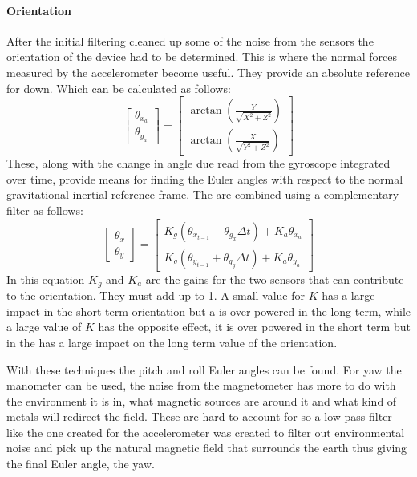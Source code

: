 \documentclass{report}
\begin{document}
\paragraph{Orientation} After the initial filtering cleaned up some of the noise from the sensors the orientation of the device had to be determined. This is where the normal forces measured by the accelerometer become useful. They provide an absolute reference for down. Which can be calculated as follows:
\begin{equation}
\begin{bmatrix}
\theta_{x_{a}}\\
\theta_{y_{a}}
\end{bmatrix}
=
\begin{bmatrix}
\arctan(\frac{Y}{\sqrt{X^2+Z^2}})\\
\arctan(\frac{X}{\sqrt{Y^2+Z^2}})
\end{bmatrix}
\end{equation} 
These, along with the change in angle due read from the gyroscope integrated over time, provide means for finding the Euler angles with respect to the normal gravitational inertial reference frame. The are combined using a complementary filter as follows:
\begin{equation}
\begin{bmatrix}
\theta_x\\\theta_y
\end{bmatrix}
=
\begin{bmatrix}
K_g(\theta_{x_{t-1}}+\theta_{g_x} \Delta t)+K_a \theta_{x_{a}}\\
K_g(\theta_{y_{t-1}}+\theta_{g_y} \Delta t)+K_a \theta_{y_{a}}
\end{bmatrix}
\end{equation}
In this equation $K_g$ and $K_a$ are the gains for the two sensors that can contribute to the orientation. They must add up to 1. A small value for $K$ has a large impact in the short term orientation but a is over powered in the long term, while a large value of $K$ has the opposite effect, it is over powered in the short term but in the has a large impact on the long term value of the orientation.\par
With these techniques the pitch and roll Euler angles can be found. For yaw the manometer can be used, the noise from the magnetometer has more to do with the environment it is in, what magnetic sources are around it and what kind of metals will redirect the field. These are hard to account for so a low-pass filter like the one created for the accelerometer was created to filter out environmental noise and pick up the natural magnetic field that surrounds the earth thus giving the final Euler angle, the yaw. 
\end{document}
